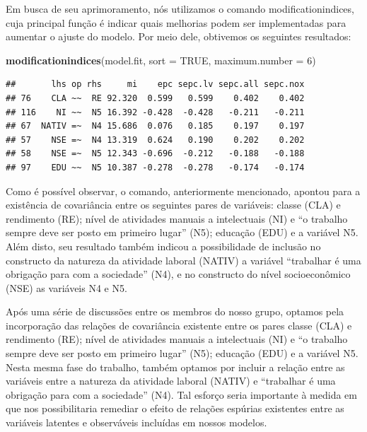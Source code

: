 \documentclass[
  12pt,
]{article}
\newenvironment{Shaded}{\begin{snugshade}}{\end{snugshade}}
\newcommand{\DataTypeTok}[1]{\textcolor[rgb]{0.13,0.29,0.53}{#1}}
\newcommand{\DecValTok}[1]{\textcolor[rgb]{0.00,0.00,0.81}{#1}}
\newcommand{\KeywordTok}[1]{\textcolor[rgb]{0.13,0.29,0.53}{\textbf{#1}}}
\newcommand{\NormalTok}[1]{#1}
\newcommand{\OtherTok}[1]{\textcolor[rgb]{0.56,0.35,0.01}{#1}}
\begin{document}
Em busca de seu aprimoramento, nós utilizamos o comando
modificationindices, cuja principal função é indicar quais melhorias
podem ser implementadas para aumentar o ajuste do modelo. Por meio dele,
obtivemos os seguintes resultados:

\scriptsize

\begin{Shaded}
\begin{Highlighting}[]
\KeywordTok{modificationindices}\NormalTok{(model.fit, }\DataTypeTok{sort =} \OtherTok{TRUE}\NormalTok{, }\DataTypeTok{maximum.number =} \DecValTok{6}\NormalTok{)}
\end{Highlighting}
\end{Shaded}

\begin{verbatim}
##       lhs op rhs     mi    epc sepc.lv sepc.all sepc.nox
## 76    CLA ~~  RE 92.320  0.599   0.599    0.402    0.402
## 116    NI ~~  N5 16.392 -0.428  -0.428   -0.211   -0.211
## 67  NATIV =~  N4 15.686  0.076   0.185    0.197    0.197
## 57    NSE =~  N4 13.319  0.624   0.190    0.202    0.202
## 58    NSE =~  N5 12.343 -0.696  -0.212   -0.188   -0.188
## 97    EDU ~~  N5 10.387 -0.278  -0.278   -0.174   -0.174
\end{verbatim}

\normalsize
\onehalfspacing

Como é possível observar, o comando, anteriormente mencionado, apontou
para a existência de covariância entre os seguintes pares de variáveis:
classe (CLA) e rendimento (RE); nível de atividades manuais a
intelectuais (NI) e ``o trabalho sempre deve ser posto em primeiro
lugar'' (N5); educação (EDU) e a variável N5. Além disto, seu resultado
também indicou a possibilidade de inclusão no constructo da natureza da
atividade laboral (NATIV) a variável ``trabalhar é uma obrigação para
com a sociedade'' (N4), e no constructo do nível socioeconômico (NSE) as
variáveis N4 e N5.

Após uma série de discussões entre os membros do nosso grupo, optamos
pela incorporação das relações de covariância existente entre os pares
classe (CLA) e rendimento (RE); nível de atividades manuais a
intelectuais (NI) e ``o trabalho sempre deve ser posto em primeiro
lugar'' (N5); educação (EDU) e a variável N5. Nesta mesma fase do
trabalho, também optamos por incluir a relação entre as variáveis entre
a natureza da atividade laboral (NATIV) e ``trabalhar é uma obrigação
para com a sociedade'' (N4). Tal esforço seria importante à medida em
que nos possibilitaria remediar o efeito de relações espúrias existentes
entre as variáveis latentes e observáveis incluídas em nossos modelos.
\end{document}

